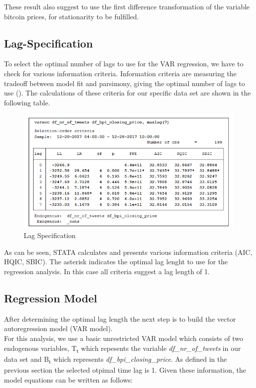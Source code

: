 \documentclass[a4paper,american,12pt]{article}
\begin{document}
\begin{spacing}{1.2}
These result also suggest to use the first difference transformation of the variable bitcoin prices, for stationarity to be fulfilled.

\subsection{Lag-Specification}
To select the optimal number of lags to use for the VAR regression, we have to check for various information criteria. Information criteria are measuring the tradeoff between model fit and parsimony, giving the optimal number of lags to use (\cite[p.~27]{brandt_williams_2007}). The calculations of these criteria for our specific data set are shown in the following table.\\

\begin{figure}[H]
\centering
\includegraphics[scale=0.85]{stata_export_graphs/LAG_crit_df_nr_tweets_df_bpi.png}
\caption{Lag Specification}
\label{fig:5}
\end{figure}

As can be seen, STATA calculates and presents various information criteria (AIC, HQIC, SBIC). The asterisk indicates the optimal lag lenght to use for the regression analysis. In this case all criteria suggest a lag length of 1.
		
\subsection{Regression Model}
After determining the optimal lag length the next step is to build the vector autoregression model (VAR model).\\
For this analysis, we use a basic unrestricted VAR model which consists of two endogenous variables, T\textsubscript t which repesents the variable {\itshape df\_nr\_of\_tweets} in our data set and B\textsubscript t which represents {\itshape df\_bpi\_closing\_price}. As defined in the previous section the selected otpimal time lag is 1. Given these information, the model equations can be written as follows:


\end{spacing}
\end{document}

